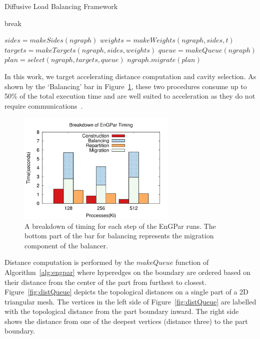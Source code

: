 \documentclass[graybox]{svmult}
\begin{document}
\begin{algorithm}[H]
  \caption{Diffusive Load Balancing Framework}
  \label{alg:engpar}
  \small
  \begin{algorithmic}[1]
    \State break
    \EndIf
    \EndWhile
    \EndFor
    \EndProcedure

    \State $sides = makeSides(ngraph)$
    \State $weights = makeWeights(ngraph,sides,t)$
    \State $targets = makeTargets(ngraph,sides,weights)$
    \State $queue = makeQueue(ngraph)$
    \State $plan = select(ngraph,targets,queue)$
    \State $ngraph.migrate(plan)$
    \EndProcedure
  \end{algorithmic}
\end{algorithm}

In this work, we target accelerating distance computation and cavity selection.
As shown by the `Balancing' bar in Figure~\ref{fig:partsgraph}, these two
procedures consume up to 50\% of the total execution time and are well suited to
acceleration as they do not require communications~\cite{engparSC17}.

\begin{figure}
  \centering
  \includegraphics[width=3in]{images/timeparts_v_cores.png}
  \caption{A breakdown of timing for each step of the EnGPar runs. The
    bottom part of the bar for balancing represents the migration
    component of the balancer.~\cite{engparSC17}}
  \label{fig:partsgraph}
\end{figure}

Distance computation is performed by the $makeQueue$ function of
Algorithm~\ref{alg:engpar} where hyperedges on the boundary are ordered based on
their distance from the center of the part from furthest to closest.
Figure~\ref{fig:distQueue} depicts the topological distances on a single part of
a 2D triangular mesh.
The vertices in the left side of Figure~\ref{fig:distQueue} are labelled with
the topological distance from the part boundary inward.
The right side shows the distance from one of the deepest vertices (distance
three) to the part boundary.
\end{document}
